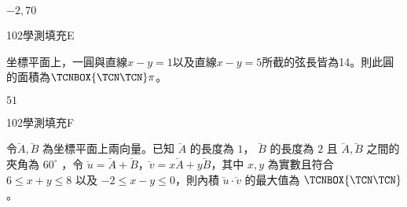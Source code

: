 \begin{QUESTIONS}
\begin{QUESTION}
        \begin{QANS}
            $-2,70$
        \end{QANS}
        \begin{QSOLLIST}
        \end{QSOLLIST}
        \begin{QEMPTYSPACE}
        \end{QEMPTYSPACE}
    \end{QUESTION}
    \begin{QUESTION}
        \begin{ExamInfo}{102}{學測}{填充}{E}
        \end{ExamInfo}
        \begin{ExamAnsRateInfo}{29}{67}{19}{1}
        \end{ExamAnsRateInfo}
        \begin{QBODY}
            坐標平面上，一圓與直線$x-y=1$以及直線$x-y=5$所截的弦長皆為14。則此圓的面積為$\TCNBOX{\TCN\TCN} \pi $。
        \end{QBODY}
        \begin{QFROMS}
        \end{QFROMS}
        \begin{QTAGS}\end{QTAGS}
        \begin{QANS}
            $51$
        \end{QANS}
        \begin{QSOLLIST}
        \end{QSOLLIST}
        \begin{QEMPTYSPACE}
        \end{QEMPTYSPACE}
    \end{QUESTION}
    \begin{QUESTION}
        \begin{ExamInfo}{102}{學測}{填充}{F}
        \end{ExamInfo}
        \begin{ExamAnsRateInfo}{11}{29}{3}{1}
        \end{ExamAnsRateInfo}
        \begin{QBODY}
            令$\lvec{A}, \lvec{B}$  為坐標平面上兩向量。已知 $\lvec{A}$ 的長度為 $1$， $\lvec{B}$ 的長度為 $2$ 且 $\lvec{A}, \lvec{B}$ 之間的夾角為 $60 ^\circ$ ，令 $\lvec{u} = \lvec{A} + \lvec{B}$，$\lvec{v} = x\lvec{A} + y \lvec{B} $，其中 $x,y$ 為實數且符合 $6 \le x+y  \le 8 $ 以及 $-2 \le x-y \le 0$，則內積 $\lvec{u} \cdot \lvec{v}$ 的最大值為 $\TCNBOX{ \TCN\TCN }$ 。

\end{QBODY}
\end{QUESTION}
\end{QUESTIONS}
